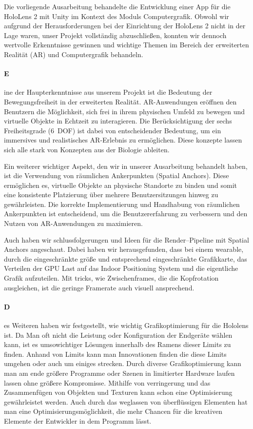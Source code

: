 Die vorliegende Ausarbeitung behandelte die Entwicklung einer App für die HoloLens 2 mit Unity im Kontext des Moduls Computergrafik.
Obwohl wir aufgrund der Herausforderungen bei der Einrichtung der HoloLens 2 nicht in der Lage waren, unser Projekt vollständig abzuschließen, konnten wir dennoch wertvolle Erkenntnisse gewinnen und wichtige Themen im Bereich der erweiterten Realität (AR) und Computergrafik behandeln.

\paragraph{E}ine der Haupterkenntnisse aus unserem Projekt ist die Bedeutung der Bewegungsfreiheit in der erweiterten Realität.
AR-Anwendungen eröffnen den Benutzern die Möglichkeit, sich frei in ihrem physischen Umfeld zu bewegen und virtuelle Objekte in Echtzeit zu interagieren.
Die Berücksichtigung der sechs Freiheitsgrade (6~DOF) ist dabei von entscheidender Bedeutung, um ein immersives und realistisches AR-Erlebnis zu ermöglichen.
Diese konzepte lassen sich alle stark von Konzepten aus der Biologie ableiten.


Ein weiterer wichtiger Aspekt, den wir in unserer Ausarbeitung behandelt haben, ist die Verwendung von räumlichen Ankerpunkten (Spatial Anchors).
Diese ermöglichen es, virtuelle Objekte an physische Standorte zu binden und somit eine konsistente Platzierung über mehrere Benutzersitzungen hinweg zu gewährleisten.
Die korrekte Implementierung und Handhabung von räumlichen Ankerpunkten ist entscheidend, um die Benutzererfahrung zu verbessern und den Nutzen von AR-Anwendungen zu maximieren.

Auch haben wir schlussfolgerungen und Ideen für die Render--Pipeline mit Spatial Anchors angeschaut.
Dabei haben wir herausgefunden, dass bei einem wearable, durch die eingeschränkte größe und entsprechend eingeschränkte Grafikkarte, das Verteilen der GPU Last auf das Indoor Positioning System und die eigentliche Grafik aufzuteilen.
Mit tricks, wie Zwischenframes, die die Kopfrotation ausgleichen, ist die geringe Framerate auch visuell ansprechend.

\paragraph{D}es Weiteren haben wir festgestellt, wie wichtig Grafikoptimierung für die Hololens ist. 
Da Man oft nicht die Leistung oder Konfiguration der Endgeräte wählen kann, ist es umsowichtiger Lösungen innerhalb des Ramens dieser Limits zu finden.
Anhand von Limits kann man Innovationen finden die diese Limits umgehen oder auch um einiges strecken.
Durch diverse Grafikoptimierung kann man am ende größere Programme oder Szenen in limitierter Hardware laufen lassen ohne größere Kompromisse.
Mithilfe von verringerung und das Zusammenfügen von Objekten und Texturen kann schon eine Optimisierung gewährleistet werden.
Auch durch das weglassen von überflüssigen Elementen hat man eine Optimisierungsmöglichkeit, die mehr Chancen für die kreativen Elemente der Entwickler in dem Programm lässt.

